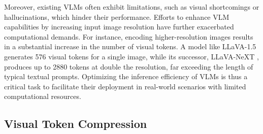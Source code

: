 Moreover, existing VLMs often exhibit limitations, such as visual shortcomings or hallucinations, which hinder their performance. Efforts to enhance VLM capabilities by increasing input image resolution have further exacerbated computational demands. For instance, encoding higher-resolution images results in a substantial increase in the number of visual tokens. A model like LLaVA-1.5 \citep{liu2024improved} generates 576 visual tokens for a single image, while its successor, LLaVA-NeXT \citep{liu2024llavanext}, produces up to 2880 tokens at double the resolution, far exceeding the length of typical textual prompts.
Optimizing the inference efficiency of VLMs is thus a critical task to facilitate their deployment in real-world scenarios with limited computational resources.

\subsection{Visual Token Compression}

